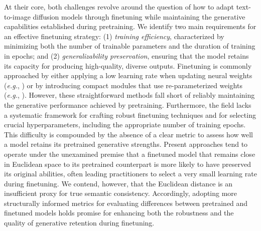 At their core, both challenges revolve around the question of how to adapt text-to-image diffusion models through finetuning while maintaining the generative capabilities established during pretraining. We identify two main requirements for an effective finetuning strategy: (1) \emph{training efficiency}, characterized by minimizing both the number of trainable parameters and the duration of training in epochs; and (2) \emph{generalizability preservation}, ensuring that the model retains its capacity for producing high-quality, diverse outputs. Finetuning is commonly approached by either applying a low learning rate when updating neural weights (\emph{e.g.}, \cite{ruiz2023dreambooth}) or by introducing compact modules that use re-parameterized weights (\emph{e.g.}, \cite{hulora2022,zhang2023adding}). However, these straightforward methods fall short of reliably maintaining the generative performance achieved by pretraining. Furthermore, the field lacks a systematic framework for crafting robust finetuning techniques and for selecting crucial hyperparameters, including the appropriate number of training epochs. This difficulty is compounded by the absence of a clear metric to assess how well a model retains its pretrained generative strengths. Present approaches tend to operate under the unexamined premise that a finetuned model that remains close in Euclidean space to its pretrained counterpart is more likely to have preserved its original abilities, often leading practitioners to select a very small learning rate during finetuning. We contend, however, that the Euclidean distance is an insufficient proxy for true semantic consistency. Accordingly, adopting more structurally informed metrics for evaluating differences between pretrained and finetuned models holds promise for enhancing both the robustness and the quality of generative retention during finetuning.

